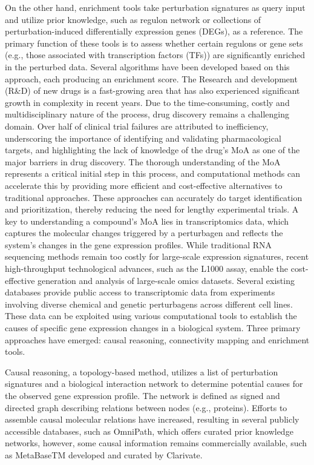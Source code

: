 On the other hand, enrichment tools take perturbation signatures as query input and utilize prior knowledge, such as regulon network or collections of perturbation-induced differentially expression genes (DEGs), as a reference. The primary function of these tools is to assess whether certain regulons or gene sets (e.g., those associated with transcription factors (TFs)) are significantly enriched in the perturbed data. Several algorithms have been developed based on this approach, each producing an enrichment score.
The Research and development (R\&D) of new drugs is a fast-growing area that has also experienced significant growth in complexity in recent years. Due to the time-consuming, costly and multidisciplinary nature of the process, drug discovery remains a challenging domain. Over half of clinical trial failures are attributed to inefficiency, underscoring the importance of identifying and validating pharmacological targets, and highlighting the lack of knowledge of the drug’s \gls{MoA} as one of the major barriers in drug discovery. The thorough understanding of the MoA represents a critical initial step in this process, and computational methods can accelerate this by providing more efficient and cost-effective alternatives to traditional approaches. These approaches can accurately do target identification and prioritization, thereby reducing the need for lengthy experimental trials.
A key to understanding a compound’s \gls{MoA} lies in transcriptomics data, which captures the molecular changes triggered by a perturbagen and reflects the system’s changes in the gene expression profiles. While traditional RNA sequencing methods remain too costly for large-scale expression signatures, recent high-throughput technological advances, such as the L1000 assay, enable the cost-effective generation and analysis of large-scale omics datasets. Several existing databases provide public access to transcriptomic data from experiments involving diverse chemical and genetic perturbagens across different cell lines. These data can be exploited using various computational tools to establish the causes of specific gene expression changes in a biological system. Three primary approaches have emerged: causal reasoning, connectivity mapping and enrichment tools.

Causal reasoning, a topology-based method, utilizes a list of perturbation signatures and a biological interaction network to determine potential causes for the observed gene expression profile. The network is defined as signed and directed graph describing relations between nodes (e.g., proteins). Efforts to assemble causal molecular relations have increased, resulting in several publicly accessible databases, such as OmniPath, which offers curated prior knowledge networks, however, some causal information remains commercially available, such as MetaBaseTM developed and curated by Clarivate.

